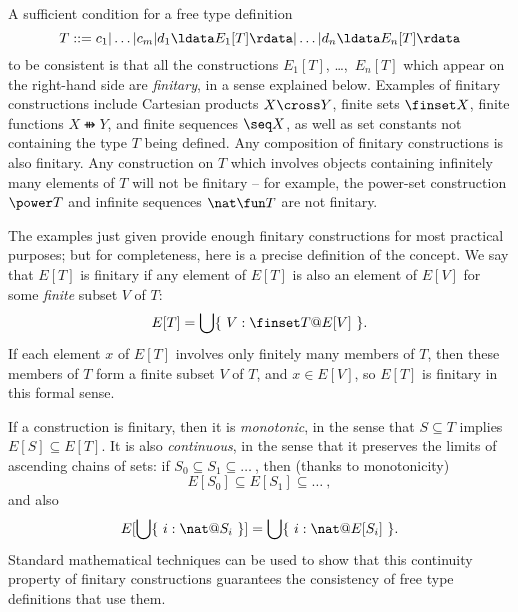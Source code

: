 A sufficient condition for a free type definition 
\[ T ::= c_1 | \ldots | c_m | d_1 \ldata E_1[T] \rdata %
                                | \ldots | d_n \ldata E_n[T] \rdata \]
to be consistent is that all the constructions $E_1[T]$,
\dots,~$E_n[T]$ which appear on the right-hand side are {\em
finitary},%
in a sense explained below.
Examples of finitary constructions include Cartesian products $X
\cross Y$, finite sets $\finset X$, finite functions $X \ffun Y$, and
finite sequences $\seq X$, as well as set constants not containing the
type $T$ being defined.  Any composition of finitary constructions is
also finitary. Any construction on $T$ which involves objects
containing infinitely many elements of $T$ will not be finitary -- for
example, the power-set construction $\power T$ and infinite sequences
$\nat \fun T$ are not finitary.

\new The examples just given provide enough finitary constructions
for most practical purposes; but for completeness, here is a precise
definition of the concept.
We say that $E[T]$ is finitary if any element of $E[T]$ is
also an element of $E[V]$ for some {\em finite\/} subset $V$ of $T$:
\[ E[T] = \bigcup \{~V: \finset T @ E[V]~\}. \]
If each element $x$ of $E[T]$ involves only finitely many members of
$T$, then these members of $T$ form a finite subset $V$ of $T$, and
$x \in E[V]$, so $E[T]$ is finitary in this formal sense.%

\new If a construction is finitary, then it is {\em monotonic}, in
the sense that $S \subseteq T$ implies $E[S] \subseteq E[T]$.  It is
also {\em continuous}, in the sense that it preserves the limits of
ascending chains of sets:  if $S_0 \subseteq S_1 \subseteq \ldots~$,
then (thanks to monotonicity)
\[ E[S_0] \subseteq E[S_1] \subseteq \ldots~, \]
and also
\[ E[\bigcup \{~i: \nat @ S_i~\}]
	= \bigcup \{~i: \nat @ E[S_i]~\}. \]
Standard mathematical techniques can be used to show that this
continuity property of finitary constructions guarantees the
consistency of free type definitions that use them.



